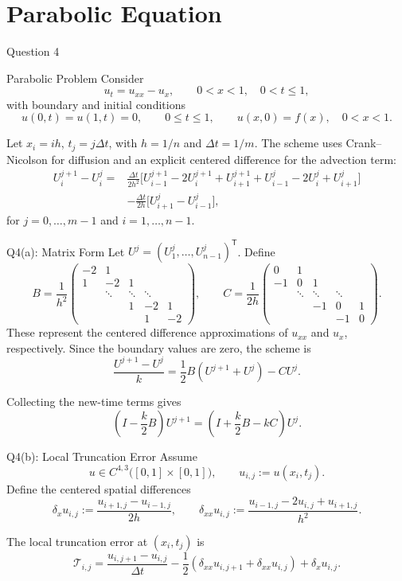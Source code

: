 \documentclass{beamer}
\begin{document}
\section[Parabolic]{Parabolic Equation}
\begin{frame}{Question 4}
\begin{block}{Parabolic Problem}
Consider
\[
u_t=u_{xx}-u_x,\qquad 0<x<1,\quad 0<t\le1,
\]
with boundary and initial conditions
\[
u(0,t)=u(1,t)=0,\qquad 0\le t\le1,
\qquad
u(x,0)=f(x),\quad 0<x<1.
\]
\end{block}
Let $x_i=ih$, $t_j=j\Delta t$, with $h=1/n$ and $\Delta t=1/m$.
The scheme uses Crank--Nicolson for diffusion and an explicit centered
difference for the advection term:
\[
\begin{aligned}
U_i^{j+1}-U_i^j
={}&\frac{\Delta t}{2h^2}
\Big[
U_{i-1}^{j+1}-2U_i^{j+1}+U_{i+1}^{j+1}
+U_{i-1}^{j}-2U_i^{j}+U_{i+1}^{j}
\Big]\\
&-\frac{\Delta t}{2h}
\Big[
U_{i+1}^{j}-U_{i-1}^{j}
\Big],
\end{aligned}
\]
for $j=0,\ldots,m-1$ and $i=1,\ldots,n-1$.

\end{frame}


\begin{frame}{Q4(a): Matrix Form}
Let $U^j=(U_1^j,\ldots,U_{n-1}^j)^\mathsf{T}$. Define
\[
B=\frac{1}{h^2}
\begin{pmatrix}
-2&1\\
1&-2&1\\
&\ddots&\ddots&\ddots\\
&&1&-2&1\\
&&&1&-2
\end{pmatrix},
\qquad
C=\frac{1}{2h}
\begin{pmatrix}
0&1\\
-1&0&1\\
&\ddots&\ddots&\ddots\\
&&-1&0&1\\
&&&-1&0
\end{pmatrix}.
\]
These represent the centered difference approximations of $u_{xx}$ and
$u_x$, respectively. Since the boundary values are zero, the scheme is
\[
\frac{U^{j+1}-U^j}{k}
=
\frac12B(U^{j+1}+U^j)-CU^j.
\]

Collecting the new-time terms gives
\[
\boxed{
\left(I-\frac{k}{2}B\right)U^{j+1}
=
\left(I+\frac{k}{2}B-kC\right)U^j.
}
\]
\end{frame}

\begin{frame}{Q4(b): Local Truncation Error}
Assume
\[
u\in C^{4,3}\bigl([0,1]\times[0,1]\bigr),
\qquad
u_{i,j}:=u(x_i,t_j).
\]
Define the centered spatial differences
\[
\delta_x u_{i,j}
:=\frac{u_{i+1,j}-u_{i-1,j}}{2h},
\qquad
\delta_{xx}u_{i,j}
:=\frac{u_{i-1,j}-2u_{i,j}+u_{i+1,j}}{h^2}.
\]

The local truncation error at $(x_i,t_j)$ is
\[
\mathcal{T}_{i,j}
=
\frac{u_{i,j+1}-u_{i,j}}{\Delta t}
-\frac12\left(\delta_{xx}u_{i,j+1}+\delta_{xx}u_{i,j}\right)
+\delta_xu_{i,j}.
\]
    
\end{frame}
\end{document}

